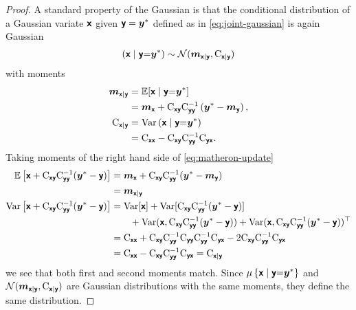 \documentclass[wcp]{jmlr} %
\begin{document}
\begin{proof}
    A standard property of the Gaussian \citep[e.g.][]{Petersen2012Matrix} is that the conditional distribution of a Gaussian variate  $\vrv{x}$ given $\vrv{y} = \vv{y}^*$ defined as in \eqref{eq:joint-gaussian} is again Gaussian
    \begin{align}
        \left(\vrv{x} \gvn \vrv{y} {=} \vv{y}^*\right)
        \sim\Normal(\vv{m}_{\vrv{x}\gvn\vrv{y}}, \mm{C}_{\vrv{x}\gvn\vrv{y}})\label{eq:conditional-gaussian}
    \end{align}
    with moments
    \begin{align}
        \vv{m}_{\vrv{x}\gvn\vrv{y}}
            &=\Ex [\vrv{x} \gvn \vrv{y} {=} \vv{y}^*] \\
            &= \vv{m}_{\vrv{x}} + \mm{C}_{\vrv{xy}} \mm{C}_{\vrv{yy}}^{-1} \left( \vv{y}^* - \vv{m}_{\vrv{y}} \right), \label{eq:conditional-mean}\\
        \mm{C}_{\vrv{x}\gvn\vrv{y}}
            &= \var \left(\vrv{x} \gvn \vrv{y} {=} \vv{y}^*\right) \\
            &= \mm{C}_{\vrv{xx}} - \mm{C}_{\vrv{xy}} \mm{C}_{\vrv{yy}}^{-1} \mm{C}_{\vrv{yx}}. \label{eq:conditional-cov}
    \end{align}
Taking moments of the right hand side of \eqref{eq:matheron-update}
\begin{align}
\Ex\left[\vrv{x}+\mm{C}_{\vrv{xy}} \mm{C}_{\vrv{yy}}^{-1}(\vv{y}^*-\vrv{y})\right]
&=\vv{m}_{\vrv{x}} +\mm{C}_{\vrv{xy}}\mm{C}_{\vrv{yy}}^{-1}(\vv{y}^*-\vv{m}_{\vrv{y}})\\
&=\vv{m}_{\vrv{x}\gvn\vrv{y}}\\
\var\left[\vrv{x}+\mm{C}_{\vrv{xy}} \mm{C}_{\vrv{yy}}^{-1}(\vv{y}^*-\vrv{y})\right]
&=
    \var[\vrv{x}]+\var[\mm{C}_{\vrv{xy}} \mm{C}_{\vrv{yy}}^{-1}(\vv{y}^*-\vrv{y})] \\
    &\hspace{2em} +\var(\vrv{x},\mm{C}_{\vrv{xy}} \mm{C}_{\vrv{yy}}^{-1}(\vv{y}^*-\vrv{y}))
    +\var(\vrv{x},\mm{C}_{\vrv{xy}} \mm{C}_{\vrv{yy}}^{-1}(\vv{y}^*-\vrv{y}))^{\top}\\
&=\mm{C}_{\vrv{x}\vrv{x}} +\mm{C}_{\vrv{xy}} \mm{C}_{\vrv{yy}}^{-1}\mm{C}_{\vrv{yy}} \mm{C}_{\vrv{yy}}^{-1}\mm{C}_{\vrv{yx}}
-  2\mm{C}_{\vrv{xy}} \mm{C}_{\vrv{yy}}^{-1}\mm{C}_{\vrv{yx}}\\
&=\mm{C}_{\vrv{x}\vrv{x}} -\mm{C}_{\vrv{xy}} \mm{C}_{\vrv{yy}}^{-1}\mm{C}_{\vrv{yx}} =\mm{C}_{\vrv{x}\gvn\vrv{y}}
\end{align}
we see that both first and second moments match.
Since $\Law\left\{\vrv{x} \gvn \vrv{y} {=} \vv{y}^*\right\}$ and
$\Normal(\vv{m}_{\vrv{x}\gvn\vrv{y}}, \mm{C}_{\vrv{x}\gvn\vrv{y}})$ are Gaussian distributions with the same moments, they define the same distribution.
\end{proof}
\end{document}

